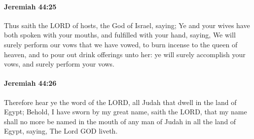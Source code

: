 		\paragraph{Jeremiah 44:25} %
			\label{JEREMIAH-44-25}

			Thus saith the LORD of hosts, the God of Israel, saying; Ye and your wives have both spoken with your mouths, and fulfilled with your hand, saying, We will surely perform our vows that we have vowed, to burn incense to the queen of heaven, and to pour out drink offerings unto her: ye will surely accomplish your vows, and surely perform your vows.


		\paragraph{Jeremiah 44:26} %
			\label{JEREMIAH-44-26}

			Therefore hear ye the word of the LORD, all Judah that dwell in the land of Egypt; Behold, I have sworn by my great name, saith the LORD, that my name shall no more be named in the mouth of any man of Judah in all the land of Egypt, saying, The Lord GOD liveth.

